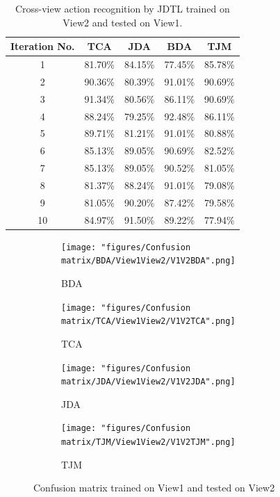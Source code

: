 \begin{table}[]
	\centering
	\caption{Cross-view action recognition by JDTL trained on View2 and tested on View1.} 
	\begin{tabular}{@{\extracolsep{12pt}}ccccc}
		\toprule   
		Iteration No. &  TCA & JDA & BDA & TJM\\ 
		\hline
		\midrule
		1&	81.70\%&	84.15\%&	77.45\%&	85.78\%\\
		2&	90.36\%&	80.39\%&	91.01\%&	90.69\%\\
		3&	91.34\%&	80.56\%&	86.11\%&	90.69\%\\
		4&	88.24\%&	79.25\%&	92.48\%&	86.11\%\\
		5&	89.71\%&	81.21\%&	91.01\%&	80.88\%\\
		6&	85.13\%&	89.05\%&	90.69\%&	82.52\%\\
		7&	85.13\%&	89.05\%&	90.52\%&	81.05\%\\
		8&	81.37\%&	88.24\%&	91.01\%&	79.08\%\\
		9&	81.05\%&	90.20\%&	87.42\%&	79.58\%\\
		10&	84.97\%&	91.50\%&	89.22\%&	77.94\%\\
		\bottomrule
		\hline
		\midrule
	\end{tabular}%
	\label{table8}
\end{table}


\begin{figure}[H]
	\begin{subfigure}{.5\textwidth}
		\centering
		\texttt{[image: "figures/Confusion matrix/BDA/View1View2/V1V2BDA".png]}
		\caption{BDA}
		\label{fig:V1V2BDA}
	\end{subfigure}%
	\begin{subfigure}{.5\textwidth}
		\centering
		\texttt{[image: "figures/Confusion matrix/TCA/View1View2/V1V2TCA".png]}
		\caption{TCA}
		\label{fig:V1V2TCA}
	\end{subfigure}
	\begin{subfigure}{.5\textwidth}
		\centering
		\texttt{[image: "figures/Confusion matrix/JDA/View1View2/V1V2JDA".png]}
		\caption{JDA}
		\label{fig:V1V2JDA}
	\end{subfigure}%
	\begin{subfigure}{.5\textwidth}
		\centering
		\texttt{[image: "figures/Confusion matrix/TJM/View1View2/V1V2TJM".png]}
		\caption{TJM}
		\label{fig:V1V2TJM}
	\end{subfigure}
	\caption{Confusion matrix trained on View1 and tested on View2}
	\label{fig:CMV1V2}
\end{figure}



